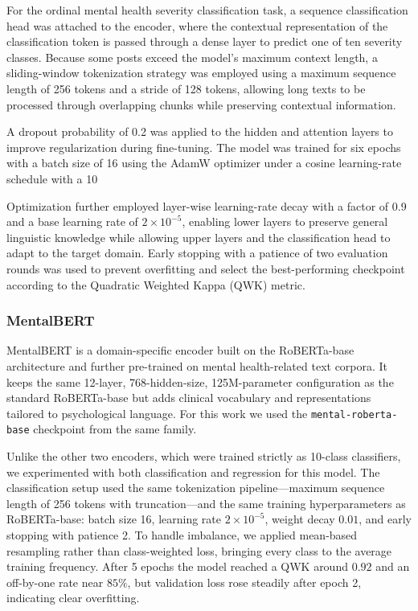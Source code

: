 \documentclass[conference]{IEEEtran}
\begin{document}
For the ordinal mental health severity classification task, a sequence classification head was attached to the encoder, where the contextual representation of the classification token is passed through a dense layer to predict one of ten severity classes. Because some posts exceed the model’s maximum context length, a sliding-window tokenization strategy was employed using a maximum sequence length of 256 tokens and a stride of 128 tokens, allowing long texts to be processed through overlapping chunks while preserving contextual information.

A dropout probability of 0.2 was applied to the hidden and attention layers to improve regularization during fine-tuning. The model was trained for six epochs with a batch size of 16 using the AdamW optimizer under a cosine learning-rate schedule with a 10%

Optimization further employed layer-wise learning-rate decay with a factor of 0.9 and a base learning rate of $2\times10^{-5}$, enabling lower layers to preserve general linguistic knowledge while allowing upper layers and the classification head to adapt to the target domain. Early stopping with a patience of two evaluation rounds was used to prevent overfitting and select the best-performing checkpoint according to the Quadratic Weighted Kappa (QWK) metric.


\subsubsection{\textbf{MentalBERT}}
MentalBERT \cite{ji2022mentalbert} is a domain-specific encoder built on the RoBERTa-base architecture and further pre-trained on mental health-related text corpora. It keeps the same 12-layer, 768-hidden-size, 125M-parameter configuration as the standard RoBERTa-base but adds clinical vocabulary and representations tailored to psychological language. For this work we used the \texttt{mental-roberta-base} checkpoint from the same family.

Unlike the other two encoders, which were trained strictly as 10-class classifiers, we experimented with both classification and regression for this model. The classification setup used the same tokenization pipeline---maximum sequence length of 256 tokens with truncation---and the same training hyperparameters as RoBERTa-base: batch size 16, learning rate $2\times10^{-5}$, weight decay $0.01$, and early stopping with patience 2. To handle imbalance, we applied mean-based resampling rather than class-weighted loss, bringing every class to the average training frequency. After 5 epochs the model reached a QWK around $0.92$ and an off-by-one rate near $85\%$, but validation loss rose steadily after epoch 2, indicating clear overfitting.
\end{document}
